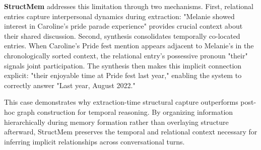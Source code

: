 \textbf{StructMem} addresses this limitation through two mechanisms. First, relational entries capture interpersonal dynamics during extraction: "Melanie showed interest in Caroline's pride parade experience" provides crucial context about their shared discussion. Second, synthesis consolidates temporally co-located entries. When Caroline's Pride fest mention appears adjacent to Melanie's in the chronologically sorted context, the relational entry's possessive pronoun "their" signals joint participation. The synthesis then makes this implicit connection explicit: "their enjoyable time at Pride fest last year," enabling the system to correctly answer "Last year, August 2022."

This case demonstrates why extraction-time structural capture outperforms post-hoc graph construction for temporal reasoning. By organizing information hierarchically during memory formation rather than overlaying structure afterward, StructMem preserves the temporal and relational context necessary for inferring implicit relationships across conversational turns.



